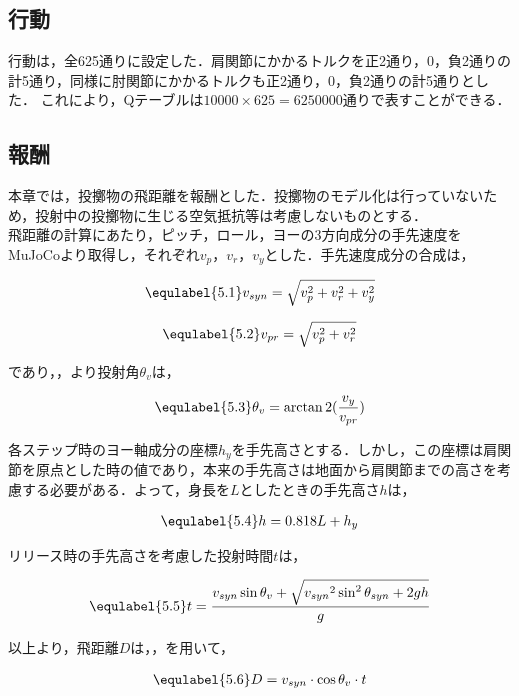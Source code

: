 \subsection{行動}
行動は，全625通りに設定した．肩関節にかかるトルクを正2通り，0，負2通りの計5通り，同様に肘関節にかかるトルクも正2通り，0，負2通りの計5通りとした．
これにより，Qテーブルは$10000 \times 625=6250000$通りで表すことができる．
\subsection{報酬}
本章では，投擲物の飛距離を報酬とした．投擲物のモデル化は行っていないため，投射中の投擲物に生じる空気抵抗等は考慮しないものとする．\\
飛距離の計算にあたり，ピッチ，ロール，ヨーの3方向成分の手先速度をMuJoCoより取得し，それぞれ$v_{p}$，$v_{r}$，$v_{y}$とした．手先速度成分の合成は，

\begin{eqnarray}
  \equlabel{5.1}
  v_{syn} = \sqrt{v_{p}^{2} + v_{r}^{2} + v_{y}^{2}}
\end{eqnarray}

\begin{eqnarray}
  \equlabel{5.2}
  v_{pr} = \sqrt{v_{p}^{2} + v_{r}^{2}}
\end{eqnarray}

であり，，より投射角$\theta_{v}$は，

\begin{eqnarray}
  \equlabel{5.3}
  \theta_{v} = \arctan2(\frac{v_{y}}{v_{pr}})
\end{eqnarray}

各ステップ時のヨー軸成分の座標$h_{y}$を手先高さとする．しかし，この座標は肩関節を原点とした時の値であり，本来の手先高さは地面から肩関節までの高さを考慮する必要がある．よって，身長を$L$としたときの手先高さ$h$は，

\begin{eqnarray}
  \equlabel{5.4}
  h = 0.818L + h_{y}
\end{eqnarray}

リリース時の手先高さを考慮した投射時間$t$は，

\begin{eqnarray}
  \equlabel{5.5}
  t = \frac{v_{syn}\sin\theta_{v} + \sqrt{{v_{syn}}^2\sin^2\theta_{syn} + 2gh}}{g}
\end{eqnarray}


以上より，飛距離$D$は，，を用いて，

\begin{eqnarray}
  \equlabel{5.6}
  D = v_{syn} \cdot \cos\theta_{v} \cdot t
\end{eqnarray}

